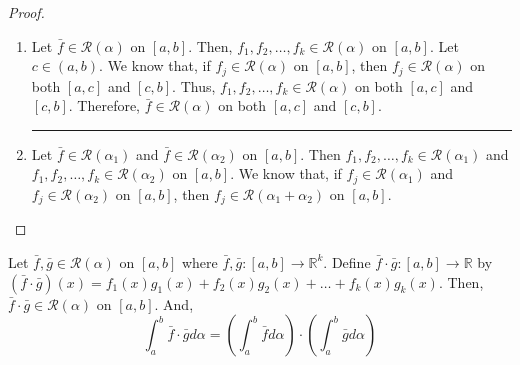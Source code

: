 \begin{commentary}
\begin{proof}
\begin{enumerate}
	\hrule \vspace{1em}
	\item
	Let $\bar{f} \in \mathscr{R}(\alpha)$ on $[a,b]$.
	Then, $f_1,f_2,\dots,f_k \in \mathscr{R}(\alpha)$ on $[a,b]$.
	Let $c \in (a,b)$.
	We know that, if $f_j \in \mathscr{R}(\alpha)$ on $[a,b]$, then $f_j \in \mathscr{R}(\alpha)$ on both $[a,c]$ and $[c,b]$.
	Thus, $f_1,f_2,\dots,f_k \in \mathscr{R}(\alpha)$ on both $[a,c]$ and $[c,b]$.
	Therefore, $\bar{f} \in \mathscr{R}(\alpha)$ on both $[a,c]$ and $[c,b]$.\\

	\hrule \vspace{1em}
	\item
	Let $\bar{f} \in \mathscr{R}(\alpha_1)$ and $\bar{f} \in \mathscr{R}(\alpha_2)$ on $[a,b]$.
	Then $f_1,f_2,\dots,f_k \in \mathscr{R}(\alpha_1)$ and $f_1,f_2,\dots,f_k \in \mathscr{R}(\alpha_2)$ on $[a,b]$.
	We know that, if $f_j \in \mathscr{R}(\alpha_1)$ and $f_j \in \mathscr{R}(\alpha_2)$ on $[a,b]$, then $f_j \in \mathscr{R}(\alpha_1+\alpha_2)$ on $[a,b]$.
\end{enumerate}
\end{proof}
\end{commentary}
\begin{challenge}
	Let $\bar{f},\bar{g} \in \mathscr{R}(\alpha)$ on $[a,b]$ where $\bar{f},\bar{g} : [a,b] \to \mathbb{R}^k$.
	Define $\bar{f} \cdot \bar{g} : [a,b] \to \mathbb{R}$ by $(\bar{f} \cdot \bar{g})(x) = f_1(x)g_1(x) + f_2(x)g_2(x) + \dots + f_k(x)g_k(x)$.
	Then, $\bar{f} \cdot \bar{g} \in \mathscr{R}(\alpha)$ on $[a,b]$.
	And,
	\[ \int_a^b \bar{f} \cdot \bar{g} d\alpha = \left( \int_a^b \bar{f} d\alpha \right) \cdot \left( \int_a^b \bar{g} d\alpha \right) \]
\end{challenge}

